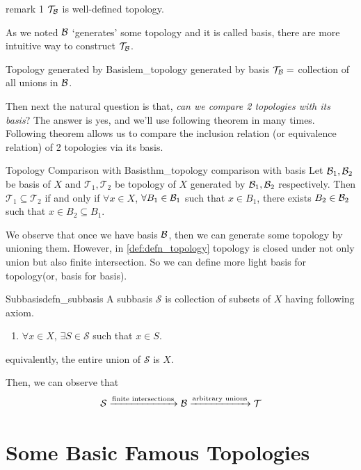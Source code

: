 \documentclass[12pt, a4paper, twoside]{article}
\newcommand{\CS}{{\mathcal {S}}} \newcommand{\CT}{{\mathcal {T}}}
\theoremstyle{plain}
\begin{document}
\begin{rem}{}{remark 1}
    $\CT_\CB$ is well-defined topology.
\end{rem}

As we noted ${\mathcal {B}}$ \lq generates' some topology and it is called basis, there are more intuitive way to construct $\CT_\CB$. 

\begin{lem}{Topology generated by Basis}{lem_topology generated by basis}
    $\CT_\CB = $ collection of all unions in ${\mathcal {B}}$.  
\end{lem}

Then next the natural question is that, \textit{can we compare 2 topologies with its basis}? 
The answer is yes, and we'll use following theorem in many times. Following theorem allows us to 
compare the inclusion relation (or equivalence relation) of 2 topologies via its basis. 

\begin{thm}{Topology Comparison with Basis}{thm_topology comparison with basis}
    Let ${\mathcal {B}}_1, {\mathcal {B}}_2$ be basis of $X$ and $\CT_1, \CT_2$ be topology of $X$ generated by ${\mathcal {B}}_1, {\mathcal {B}}_2$ respectively. 
    Then $\CT_1 \subseteq \CT_2$ if and only if $\forall x \in X$, $\forall B_1 \in {\mathcal {B}}_1$ such that $x \in B_1$, there exists $B_2 \in {\mathcal {B}}_2$ such that $x \in B_2 \subseteq B_1$. 
\end{thm}

We observe that once we have basis ${\mathcal {B}}$, then we can generate some topology by unioning them. 
However, in \ref{def:defn_topology} topology is closed under not only union but also finite intersection. 
So we can define more light basis for topology(or, basis for basis). 

\begin{defn}{Subbasis}{defn_subbasis}
    A subbasis $\CS$ is collection of subsets of $X$ having following axiom. 
    \begin{enumerate}
        \item $\forall x \in X$, $\exists S \in \CS$ such that $x \in S$. 
    \end{enumerate}
    equivalently, the entire union of $\CS$ is $X$. 
\end{defn}

Then, we can observe that 
\[\CS \xrightarrow{\text{finite intersections}} \CB \xrightarrow{\text{arbitrary unions}} \CT\]

\newpage 

\section{Some Basic Famous Topologies}
\end{document}
